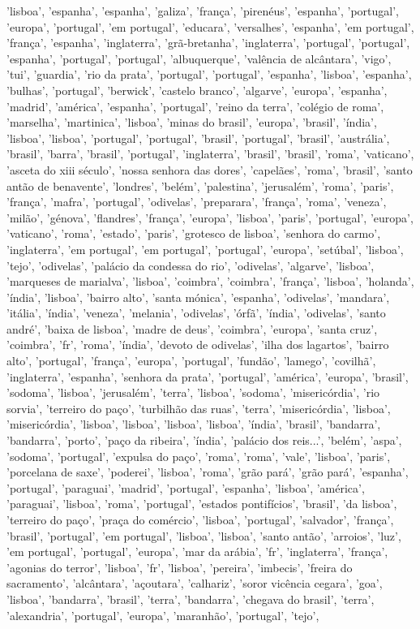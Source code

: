 \documentclass{article}
\begin{document}
\begin{itemize}
'lisboa', 'espanha', 'espanha', 'galiza', 'frança', 'pirenéus', 'espanha', 'portugal', 'europa', 'portugal', 'em portugal', 'educara', 'versalhes', 'espanha', 'em portugal', 'frança', 'espanha', 'inglaterra', 'grã-bretanha', 'inglaterra', 'portugal', 'portugal', 'espanha', 'portugal', 'portugal', 'albuquerque', 'valência de alcântara', 'vigo', 'tui', 'guardia', 'rio da prata', 'portugal', 'portugal', 'espanha', 'lisboa', 'espanha', 'bulhas', 'portugal', 'berwick', 'castelo branco', 'algarve', 'europa', 'espanha', 'madrid', 'américa', 'espanha', 'portugal', 'reino da terra', 'colégio de roma', 'marselha', 'martinica', 'lisboa', 'minas do brasil', 'europa', 'brasil', 'índia', 'lisboa', 'lisboa', 'portugal', 'portugal', 'brasil', 'portugal', 'brasil', 'austrália', 'brasil', 'barra', 'brasil', 'portugal', 'inglaterra', 'brasil', 'brasil', 'roma', 'vaticano', 'asceta do xiii século', 'nossa senhora das dores', 'capelães', 'roma', 'brasil', 'santo antão de benavente', 'londres', 'belém', 'palestina', 'jerusalém', 'roma', 'paris', 'frança', 'mafra', 'portugal', 'odivelas', 'preparara', 'frança', 'roma', 'veneza', 'milão', 'génova', 'flandres', 'frança', 'europa', 'lisboa', 'paris', 'portugal', 'europa', 'vaticano', 'roma', 'estado', 'paris', 'grotesco de lisboa', 'senhora do carmo', 'inglaterra', 'em portugal', 'em portugal', 'portugal', 'europa', 'setúbal', 'lisboa', 'tejo', 'odivelas', 'palácio da condessa do rio', 'odivelas', 'algarve', 'lisboa', 'marqueses de marialva', 'lisboa', 'coimbra', 'coimbra', 'frança', 'lisboa', 'holanda', 'índia', 'lisboa', 'bairro alto', 'santa mónica', 'espanha', 'odivelas', 'mandara', 'itália', 'índia', 'veneza', 'melania', 'odivelas', 'órfã', 'índia', 'odivelas', 'santo andré', 'baixa de lisboa', 'madre de deus', 'coimbra', 'europa', 'santa cruz', 'coimbra', 'fr', 'roma', 'índia', 'devoto de odivelas', 'ilha dos lagartos', 'bairro alto', 'portugal', 'frança', 'europa', 'portugal', 'fundão', 'lamego', 'covilhã', 'inglaterra', 'espanha', 'senhora da prata', 'portugal', 'américa', 'europa', 'brasil', 'sodoma', 'lisboa', 'jerusalém', 'terra', 'lisboa', 'sodoma', 'misericórdia', 'rio sorvia', 'terreiro do paço', 'turbilhão das ruas', 'terra', 'misericórdia', 'lisboa', 'misericórdia', 'lisboa', 'lisboa', 'lisboa', 'lisboa', 'índia', 'brasil', 'bandarra', 'bandarra', 'porto', 'paço da ribeira', 'índia', 'palácio dos reis...', 'belém', 'aspa', 'sodoma', 'portugal', 'expulsa do paço', 'roma', 'roma', 'vale', 'lisboa', 'paris', 'porcelana de saxe', 'poderei', 'lisboa', 'roma', 'grão pará', 'grão pará', 'espanha', 'portugal', 'paraguai', 'madrid', 'portugal', 'espanha', 'lisboa', 'américa', 'paraguai', 'lisboa', 'roma', 'portugal', 'estados pontifícios', 'brasil', 'da lisboa', 'terreiro do paço', 'praça do comércio', 'lisboa', 'portugal', 'salvador', 'frança', 'brasil', 'portugal', 'em portugal', 'lisboa', 'lisboa', 'santo antão', 'arroios', 'luz', 'em portugal', 'portugal', 'europa', 'mar da arábia', 'fr', 'inglaterra', 'frança', 'agonias do terror', 'lisboa', 'fr', 'lisboa', 'pereira', 'imbecis', 'freira do sacramento', 'alcântara', 'açoutara', 'calhariz', 'soror vicência cegara', 'goa', 'lisboa', 'bandarra', 'brasil', 'terra', 'bandarra', 'chegava do brasil', 'terra', 'alexandria', 'portugal', 'europa', 'maranhão', 'portugal', 'tejo', 
\end{itemize}
\end{document}
